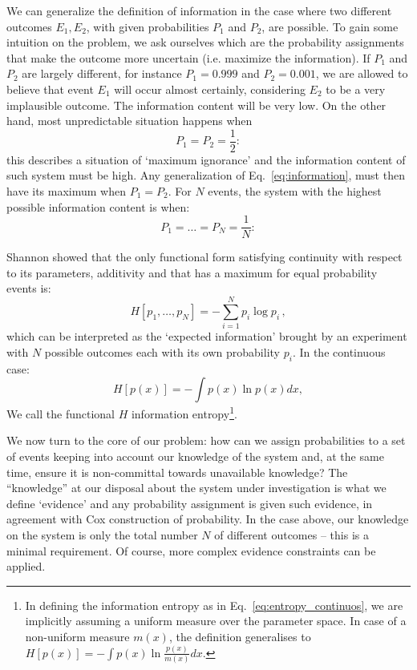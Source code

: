 \documentclass[epj,nopacs]{svjour}
\begin{document}
We can generalize the definition of information in the case where two different outcomes $E_1, E_2$, with given probabilities $P_1$ and $P_2$, are possible.
To gain some intuition on the problem, we ask ourselves which are the probability assignments that make the outcome more uncertain (i.e. maximize the information).
If $P_1$ and $P_2$ are largely different, for instance $P_1 = 0.999$ and $P_2 = 0.001$, we are allowed to believe that event $E_1$ will occur almost certainly, considering $E_2$ to be a very implausible outcome. The information content will be very low.
On the other hand, most unpredictable situation happens when 
\begin{equation}\nonumber
    P_1 = P_2 = \frac{1}{2}:
\end{equation}
this describes a situation of `maximum ignorance' and the information content of such system must be high.
Any generalization of Eq.~\eqref{eq:information}, must then have its maximum when $ P_1 = P_2$.
For $N$ events, the system with the highest possible information content is when:
\begin{equation}\nonumber
    P_1 = \hdots = P_N = \frac{1}{N}:
\end{equation}

Shannon \cite{Shannon} showed that the only functional form satisfying continuity with respect to its parameters, additivity and that has a maximum for equal probability events is:
\begin{equation}\label{eq:entropy}
    H[p_1, \dots, p_N] = - \sum_{i = 1}^N p_i\log{p_i}\,,
\end{equation}
which can be interpreted as the `expected information' brought by an experiment with $N$ possible outcomes each with its own probability $p_i$.
In the continuous case:
\begin{equation} \label{eq:entropy_continuos}
    H[p(x)] = - \int p(x)\ln p(x) dx,
\end{equation}
We call the functional $H$ information entropy\footnote{In defining the information entropy as in Eq.~\eqref{eq:entropy_continuos}, we are implicitly assuming a uniform measure over the parameter space. In case of a non-uniform measure $m(x)$, the definition generalises to $ H[p(x)] = - \int p(x)\ln \frac{p(x)}{m(x)} dx$.}.

We now turn to the core of our problem: how can we assign probabilities to a set of events keeping into account our knowledge of the system and, at the same time, ensure it is non-committal towards unavailable knowledge?
The ``knowledge'' at our disposal about the system under investigation is what we define `evidence' and any probability assignment is given such evidence, in agreement with Cox \cite{Cox} construction of probability. In the case above, our knowledge on the system is only the total number $N$ of different outcomes -- this is a minimal requirement. Of course, more complex evidence constraints can be applied.
\end{document}
